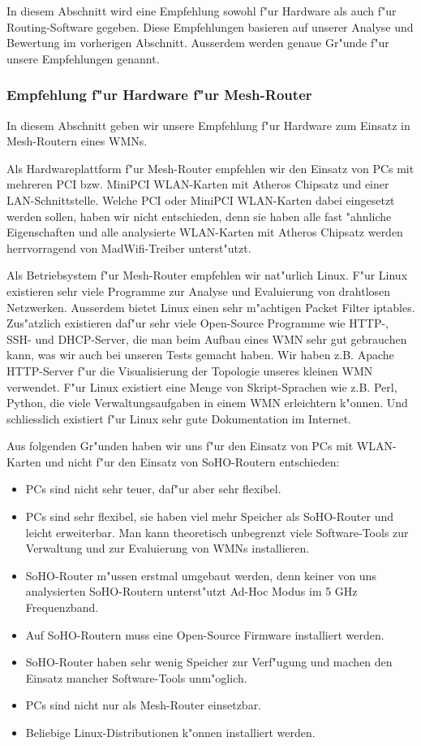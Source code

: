 In diesem Abschnitt wird eine Empfehlung sowohl f"ur Hardware als auch
f"ur Routing-Software gegeben. Diese Empfehlungen basieren auf unserer
Analyse und Bewertung im vorherigen Abschnitt. Ausserdem werden genaue Gr"unde
f"ur unsere Empfehlungen genannt.

\subsubsection{Empfehlung f"ur Hardware f"ur Mesh-Router}

In diesem Abschnitt geben wir unsere Empfehlung f"ur Hardware zum Einsatz in
Mesh-Routern eines WMNs.

Als Hardwareplattform f"ur Mesh-Router empfehlen wir den Einsatz von PCs mit
mehreren PCI bzw. MiniPCI WLAN-Karten mit Atheros Chipsatz und einer
LAN-Schnittstelle. Welche PCI oder MiniPCI WLAN-Karten dabei eingesetzt
werden sollen, haben wir nicht entschieden, denn sie haben alle fast
"ahnliche Eigenschaften und alle analysierte WLAN-Karten mit Atheros
Chipsatz werden herrvorragend von MadWifi-Treiber unterst"utzt.

Als Betriebsystem f"ur Mesh-Router empfehlen wir nat"urlich Linux.
F"ur Linux existieren sehr viele Programme zur Analyse und Evaluierung
von drahtlosen Netzwerken. Ausserdem bietet Linux einen sehr m"achtigen
Packet Filter iptables. Zus"atzlich existieren daf"ur sehr viele Open-Source
Programme wie HTTP-, SSH- und DHCP-Server, die man beim Aufbau eines WMN sehr
gut gebrauchen kann, was wir auch bei unseren Tests gemacht haben.
Wir haben z.B. Apache HTTP-Server f"ur die Visualisierung der Topologie
unseres kleinen WMN verwendet. F"ur Linux existiert eine Menge von
Skript-Sprachen wie z.B. Perl, Python, die viele Verwaltungsaufgaben
in einem WMN erleichtern k"onnen. Und schliesslich existiert f"ur Linux
sehr gute Dokumentation im Internet.

Aus folgenden Gr"unden haben wir uns f"ur den Einsatz von PCs mit
WLAN-Karten und nicht f"ur den Einsatz von SoHO-Routern entschieden:

\begin{itemize}
\item PCs sind nicht sehr teuer, daf"ur aber sehr flexibel.
\item PCs sind sehr flexibel, sie haben viel mehr Speicher als SoHO-Router
und leicht erweiterbar. Man kann theoretisch unbegrenzt viele Software-Tools
zur Verwaltung und zur Evaluierung von WMNs installieren.
\item SoHO-Router m"ussen erstmal umgebaut werden, denn keiner von uns
analysierten SoHO-Routern unterst"utzt Ad-Hoc Modus im 5 GHz Frequenzband.
\item Auf SoHO-Routern muss eine Open-Source Firmware installiert werden.
\item SoHO-Router haben sehr wenig Speicher zur Verf"ugung und machen
den Einsatz mancher Software-Tools unm"oglich.
\item PCs sind nicht nur als Mesh-Router einsetzbar.
\item Beliebige Linux-Distributionen k"onnen installiert werden.
\end{itemize}

